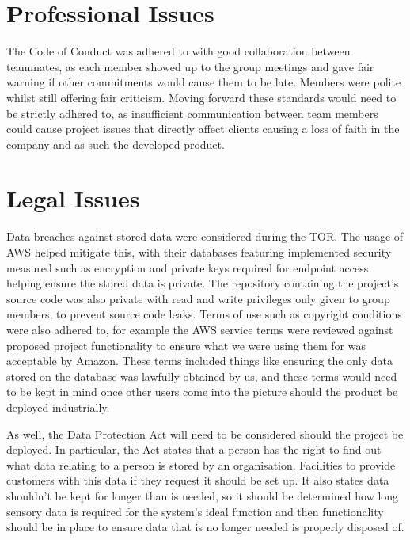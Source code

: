 \documentclass[]{report}
\begin{document}
\section{Professional Issues}
The Code of Conduct was adhered to with good collaboration between teammates, as each member showed up to the group meetings and gave fair warning if other commitments would cause them to be late. Members were polite whilst still offering fair criticism. Moving forward these standards would need to be strictly adhered to, as insufficient communication between team members could cause project issues that directly affect clients causing a loss of faith in the company and as such the developed product.

\section{Legal Issues}
Data breaches against stored data were considered during the TOR. The usage of AWS helped mitigate this, with their databases featuring implemented security measured\cite{awsdatabasedocs} such as encryption and private keys required for endpoint access helping ensure the stored data is private. The repository containing the project's source code was also private with read and write privileges only given to group members, to prevent source code leaks. Terms of use such as copyright conditions were also adhered to, for example the AWS service terms\cite{awsserviceterms} were reviewed against proposed project functionality to ensure what we were using them for was acceptable by Amazon. These terms included things like ensuring the only data stored on the database was lawfully obtained by us, and these terms would need to be kept in mind once other users come into the picture should the product be deployed industrially. 

As well, the Data Protection Act\cite{dataprotectionact2018} will need to be considered should the project be deployed. In particular, the Act states that a person has the right to find out what data relating to a person is stored by an organisation. Facilities to provide customers with this data if they request it should be set up. It also states data shouldn't be kept for longer than is needed, so it should be determined how long sensory data is required for the system's ideal function and then functionality should be in place to ensure data that is no longer needed is properly disposed of. 
\end{document}
